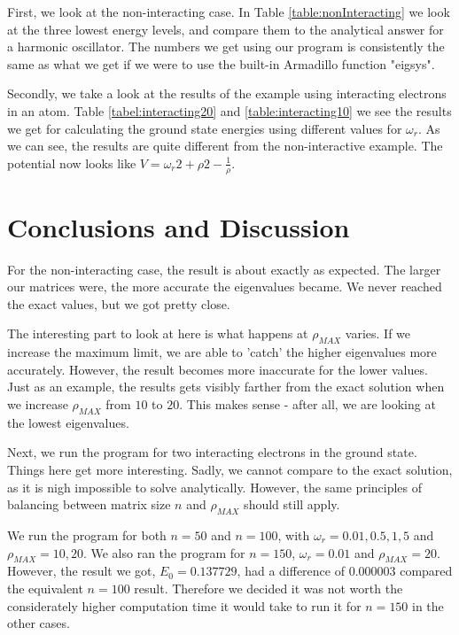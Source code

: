 \documentclass[10pt,showpacs,preprintnumbers,footinbib,amsmath,amssymb,aps,prl,twocolumn,groupedaddress,superscriptaddress,showkeys]{revtex4-1}
\begin{document}
First, we look at the non-interacting case. In Table \ref{table:nonInteracting}
 we look at the three lowest energy levels, and compare them to the analytical answer for a harmonic oscillator. The numbers we get using our program is consistently the same as what we get if we were to use the built-in Armadillo function "eigsys". 
 
Secondly, we take a look at the results of the example using interacting electrons in an atom.  Table \ref{tabel:interacting20} and \ref{table:interacting10} we see the results we get for calculating the ground state energies using different values for $\omega_r$. As we can see, the results are quite different from the non-interactive example. The potential now looks like $V = \omega_r2 + \rho 2 - \frac{1}{\rho}$.



\section{Conclusions and Discussion}

For the non-interacting case, the result is about exactly as expected. The larger our matrices were, the more accurate the eigenvalues became. We never reached the exact values, but we got pretty close.

The interesting part to look at here is what happens at $\rho_{MAX}$ varies. If we increase the maximum limit, we are able to 'catch' the higher eigenvalues more accurately. However, the result becomes more inaccurate for the lower values. Just as an example, the results gets visibly farther from the exact solution when we increase $\rho_{MAX}$ from $10$ to $20$. This makes sense - after all, we are looking at the lowest eigenvalues.

Next, we run the program for two interacting electrons in the ground state. Things here get more interesting. Sadly, we cannot compare to the exact solution, as it is nigh impossible to solve analytically. However, the same principles of balancing between matrix size $n$ and $\rho_{MAX}$ should still apply.

We run the program for both $n = 50$ and $n = 100$, with $\omega_r = 0.01, 0.5, 1, 5$ and $\rho_{MAX} = 10, 20$. We also ran the program for $n = 150$, $\omega_r = 0.01$ and $\rho_{MAX} = 20$. However, the result we got, $E_0 = 0.137729$, had a difference of $0.000003$ compared the equivalent $n = 100$ result. Therefore we decided it was not worth the considerately higher computation time it would take to run it for $n = 150$ in  the other cases.
\end{document}
